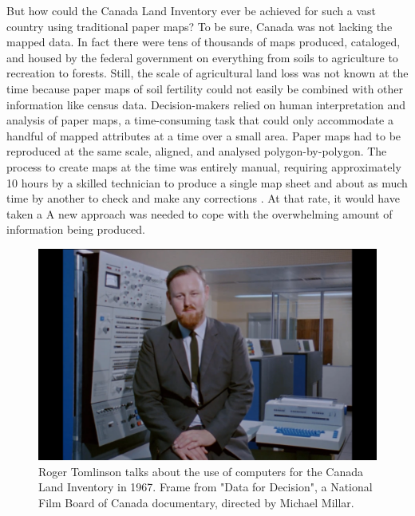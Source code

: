 \documentclass[
]{book}
\begin{document}
But how could the Canada Land Inventory ever be achieved for such a vast country using traditional paper maps? To be sure, Canada was not lacking the mapped data. In fact there were tens of thousands of maps produced, cataloged, and housed by the federal government on everything from soils to agriculture to recreation to forests. Still, the scale of agricultural land loss was not known at the time because paper maps of soil fertility could not easily be combined with other information like census data. Decision-makers relied on human interpretation and analysis of paper maps, a time-consuming task that could only accommodate a handful of mapped attributes at a time over a small area. Paper maps had to be reproduced at the same scale, aligned, and analysed polygon-by-polygon. The process to create maps at the time was entirely manual, requiring approximately 10 hours by a skilled technician to produce a single map sheet and about as much time by another to check and make any corrections \citep{tomlinson_application_1974}. At that rate, it would have taken a A new approach was needed to cope with the overwhelming amount of information being produced.

\begin{figure}
\includegraphics[width=0.75\linewidth]{images/01-data-for-decisions} \caption{Roger Tomlinson talks about the use of computers for the Canada Land Inventory in 1967. Frame from "Data for Decision", a National Film Board of Canada documentary, directed by Michael Millar.}\label{fig:1-data-for-decisions}
\end{figure}
\end{document}
